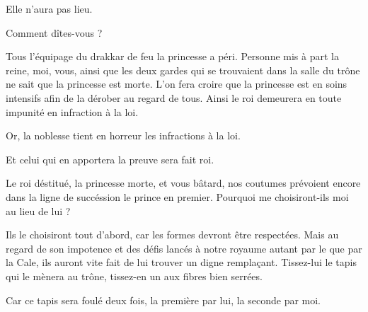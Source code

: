 \begin{drama}
  \elenaspeaks Elle n’aura pas lieu.

  \generalspeaks Comment dîtes-vous ?

  \elenaspeaks Tous l’équipage du drakkar de feu la princesse \princesse{} a péri. Personne mis à part la reine, moi, vous, ainsi que les deux gardes qui se trouvaient dans la salle du trône ne sait que la princesse est morte. L’on fera croire que la princesse est en soins intensifs afin de la dérober au regard de tous. Ainsi le roi demeurera en toute impunité en infraction à la loi.

  \generalspeaks Or, la noblesse tient en horreur les infractions à la loi.

  \elenaspeaks Et celui qui en apportera la preuve sera fait roi.

  \generalspeaks Le roi déstitué, la princesse \princesse morte, et vous bâtard, nos coutumes prévoient encore dans la ligne de succéssion le prince \vladimir{} en premier. Pourquoi me choisiront-ils moi au lieu de lui ?

  \elenaspeaks Ils le choisiront tout d’abord, car les formes devront être respectées. Mais au regard de son impotence et des défis lancés à notre royaume autant par le \campoppose que par la Cale, ils auront vite fait de lui trouver un digne remplaçant. Tissez-lui le tapis qui le mènera au trône, tissez-en un aux fibres bien serrées.

  \generalspeaks Car ce tapis sera foulé deux fois, la première par lui, la seconde par moi.
\end{drama}

\scene

\StageDirII{\general, \nobleOne, \nobleTwo, \nobleTree}


